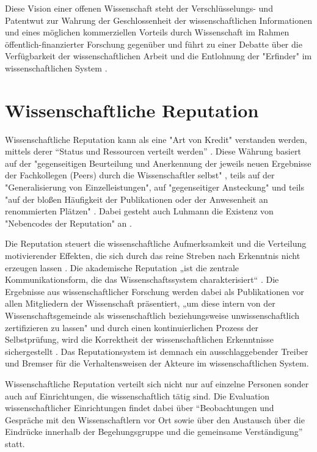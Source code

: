 Diese Vision einer offenen Wissenschaft steht der Verschlüsselungs- und Patentwut zur Wahrung der Geschlossenheit der wissenschaftlichen Informationen und eines möglichen kommerziellen Vorteils durch Wissenschaft im Rahmen öffentlich-finanzierter Forschung gegenüber und führt zu einer Debatte über die Verfügbarkeit der wissenschaftlichen Arbeit und die Entlohnung der "Erfinder" im wissenschaftlichen System \cite{suchen}.

\section{Wissenschaftliche Reputation}

Wissenschaftliche Reputation kann als eine "Art von Kredit" \cite{luhmann_1970_selbststeuerung} verstanden werden, mittels derer “Status und Ressourcen verteilt werden” \cite{hanekop_2006}. Diese Währung basiert auf der "gegenseitigen Beurteilung und Anerkennung der jeweils neuen Ergebnisse der Fachkollegen (Peers) durch die Wissenschaftler selbst" \cite{Hanekop_2014} \cite{suchen_Hornbostel_2006}, teils auf der "Generalisierung von Einzelleistungen", auf "gegenseitiger Ansteckung" und teils "auf der bloßen Häufigkeit der Publikationen oder der Anwesenheit an renommierten Plätzen" \cite{luhmann_1970_selbststeuerung}. Dabei gesteht auch Luhmann die Existenz von "Nebencodes der Reputation" an \cite{schmoch_2003_hochschulforschung}.

Die Reputation steuert die wissenschaftliche Aufmerksamkeit und die Verteilung motivierender Effekten, die sich durch das reine Streben nach Erkenntnis nicht erzeugen lassen \cite{suchen_luhmann}. Die akademische Reputation „ist die zentrale Kommunikationsform, die das Wissenschaftssystem charakterisiert“ \cite{Rutenfranz_1997}. Die Ergebnisse aus wissenschaftlicher Forschung werden dabei als Publikationen vor allen Mitgliedern der Wissenschaft präsentiert, „um diese intern von der Wissenschaftsgemeinde als wissenschaftlich beziehungsweise unwissenschaftlich zertifizieren zu lassen" \cite{Rutenfranz_1997} und durch einen kontinuierlichen Prozess der Selbstprüfung, wird die Korrektheit der wissenschaftlichen Erkenntnisse sichergestellt \cite{edsall_1976_scientific}. Das Reputationsystem ist demnach ein ausschlaggebender Treiber und Bremser für die Verhaltensweisen der Akteure im wissenschaftlichen System.

Wissenschaftliche Reputation verteilt sich nicht nur auf einzelne Personen sonder auch auf Einrichtungen, die wissenschaftlich tätig sind. Die Evaluation wissenschaftlicher Einrichtungen findet dabei über “Beobachtungen und Gespräche mit den Wissenschaftlern vor Ort sowie über den Austausch über die Eindrücke innerhalb der Begehungsgruppe und die gemeinsame Verständigung”\cite{Barl_sius_2008} statt.


